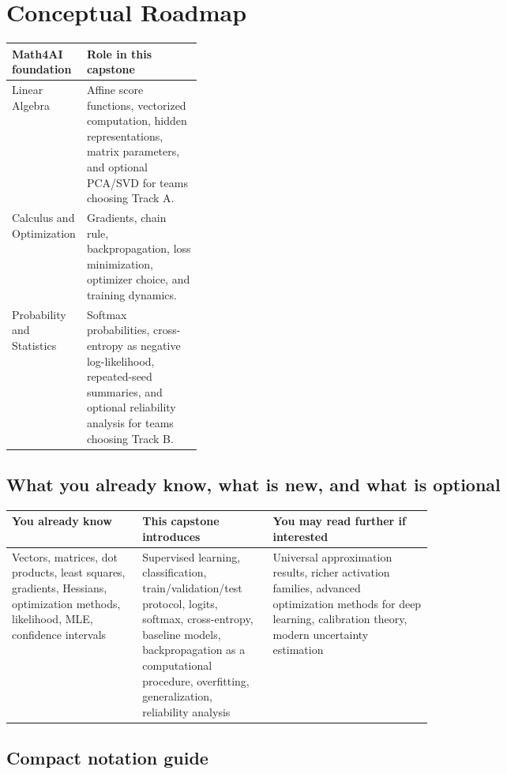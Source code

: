 \documentclass[11pt]{article}
\begin{document}
\section{Conceptual Roadmap}

\begin{tabularx}{\linewidth}{>{\raggedright\arraybackslash}p{0.28\linewidth} >{\raggedright\arraybackslash}X}
\toprule
\textbf{Math4AI foundation} & \textbf{Role in this capstone} \\
\midrule
Linear Algebra & Affine score functions, vectorized computation, hidden representations, matrix parameters, and optional PCA/SVD for teams choosing Track A. \\
Calculus and Optimization & Gradients, chain rule, backpropagation, loss minimization, optimizer choice, and training dynamics. \\
Probability and Statistics & Softmax probabilities, cross-entropy as negative log-likelihood, repeated-seed summaries, and optional reliability analysis for teams choosing Track B. \\
\bottomrule
\end{tabularx}

\subsection{What you already know, what is new, and what is optional}

\begin{tabularx}{\linewidth}{>{\raggedright\arraybackslash}p{0.31\linewidth} >{\raggedright\arraybackslash}p{0.31\linewidth} >{\raggedright\arraybackslash}X}
\toprule
\textbf{You already know} & \textbf{This capstone introduces} & \textbf{You may read further if interested} \\
\midrule
Vectors, matrices, dot products, least squares, gradients, Hessians, optimization methods, likelihood, MLE, confidence intervals & Supervised learning, classification, train/validation/test protocol, logits, softmax, cross-entropy, baseline models, backpropagation as a computational procedure, overfitting, generalization, reliability analysis & Universal approximation results, richer activation families, advanced optimization methods for deep learning, calibration theory, modern uncertainty estimation \\
\bottomrule
\end{tabularx}

\subsection{Compact notation guide}
\end{document}
